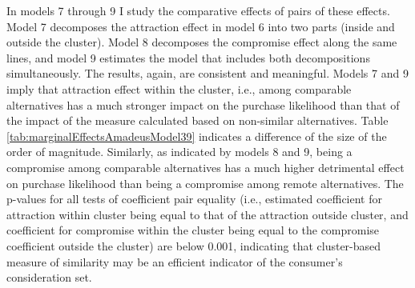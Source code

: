 \documentclass[a4paper,12pt]{article}
\begin{document}
In models 7 through 9 I study the comparative effects of pairs of these effects. Model 7 decomposes the attraction effect in model 6 into two parts (inside and outside the cluster).  Model 8 decomposes the compromise effect along the same lines, and model 9 estimates the model that includes both decompositions simultaneously. The results, again, are consistent and meaningful. Models 7 and 9 imply that attraction effect within the cluster, i.e., among comparable alternatives has a much stronger impact on the purchase likelihood than that of the impact of the measure calculated based on non-similar alternatives. Table \ref{tab:marginalEffectsAmadeusModel39} indicates a difference of the size of the order of magnitude. Similarly, as indicated by models 8 and 9, being a compromise among comparable alternatives has a much higher detrimental effect on purchase likelihood than being a compromise among remote alternatives. The p-values for all tests of coefficient pair equality (i.e., estimated coefficient for attraction within cluster being equal to that of the attraction outside cluster, and coefficient for compromise within the cluster being equal to the compromise coefficient outside the cluster) are below 0.001, indicating that cluster-based measure of similarity may be an efficient indicator of the consumer's consideration set.

\clearpage
\end{document}
